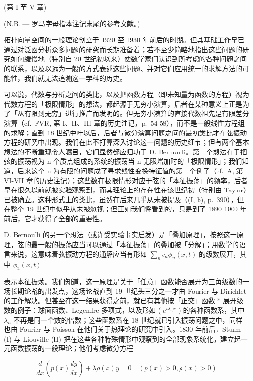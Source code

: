
(第 I 至 V 章)

(N.B. --- 罗马字母指本注记末尾的参考文献。)

拓扑向量空间的一般理论创立于 1920 至 1930 年前后的时期。但其基础工作早已通过对泛函分析众多问题的研究而长期准备着；若不至少简略地指出这些问题的研究如何缓慢地（特别自 20 世纪初以来）使数学家们认识到所考虑的各种问题之间的联系，以及以远为一般的方式表述这些问题、并对它们应用统一的求解方法的可能性，我们就无法追溯这一学科的历史。

可以说，代数与分析之间的类比，以及把函数方程（即未知量为函数的方程）视为代数方程的「极限情形」的想法，都起源于无穷小演算，后者在某种意义上正是为了「从有限到无穷」进行推广而发明的。但无穷小演算的直接代数祖先是有限差分演算（cf.~FVR, 第 I、II、III 章的历史注记，p.~54-58），而不是一般线性方程组的求解；直到 18 世纪中叶以后，后者与微分演算问题之间的最初类比才在弦振动方程的研究中出现。我们在此不打算深入讨论这一问题的历史细节；但有两个基本想法的不断重现令人瞩目，它们显然都应归功于 D. Bernoulli。第一个想法在于把弦的振荡视为 n 个质点组成的系统的振荡当 n 无限增加时的「极限情形」；我们知道，后来这个 n 为有限的问题成了寻求线性变换特征值的第一个例子（cf.~A, 第 VI-VII 章的历史注记）；这些数在极限情形对应于弦的「本征振荡」的频率，后者早在很久以前就被实验观察到，而其理论上的存在性在该世纪初（特别由 Taylor）已被确立。这种形式上的类比，虽然在后来几乎从未被提及（(I, b), p.~390），但在整个 19 世纪中似乎从未被忽视；但正如我们将看到的，只是到了 1890-1900 年前后，它才获得了全部的重要性。

D. Bernoulli 的另一个想法（或许受实验事实启发）是「叠加原理」，按照这一原理，弦的最一般的振荡应当可以通过「本征振荡」的叠加被「分解」；用数学的语言来说，这意味着弦振动方程的通解应当有形如 \(\sum_{n} c_{n} \phi_{n}(x, t)\) 的级数展开，其中 \(\phi_{n}(x, t)\)

表示本征振荡。我们知道，这一原理是关于「任意」函数能否展开为三角级数的一场长期论战的出发点，这场论战直到 19 世纪头三分之一才由 Fourier 与 Dirichlet 的工作解决。但甚至在这一结果获得之前，就已有其他按「正交」函数 * 展开级数的例子：球面函数、Legendre 多项式，以及形如 ( \(e^{i\lambda_n x}\) ) 的各种函数系，其中 \(\lambda_n\) 不再是同一个数的倍数；这些函数系在 18 世纪就已引入振荡问题之中，同样也由 Fourier 与 Poisson 在他们关于热理论的研究中引入。1830 年前后，Sturm (I) 与 Liouville (II) 把在这些各种特殊情形中观察到的全部现象系统化，建立起一元函数振荡的一般理论；他们考虑微分方程

\[
\frac {d}{d x} \left(p (x) \frac {d y}{d x}\right) + \lambda \rho (x) y = 0 \quad (p (x) > 0, \rho (x) > 0)\tag{1}
\]

